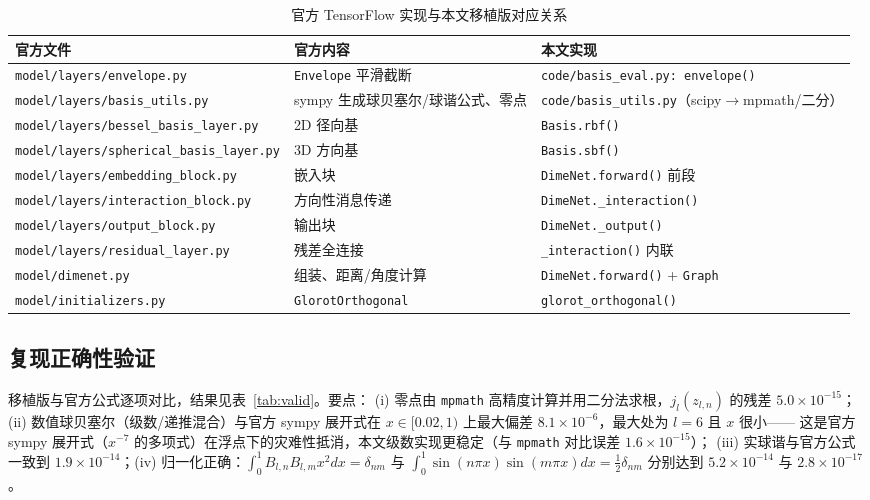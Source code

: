 \documentclass[UTF8,a4paper,11pt]{ctexart}
\begin{document}
\begin{table}[H]
\centering\footnotesize
\caption{官方 TensorFlow 实现与本文移植版对应关系}
\label{tab:map}
\begin{tabular}{@{}p{6.3cm}p{3.3cm}p{5.6cm}@{}}
\toprule
官方文件 & 官方内容 & 本文实现\\
\midrule
\texttt{model/layers/envelope.py} & \texttt{Envelope} 平滑截断 & \texttt{code/basis\_eval.py: envelope()}\\
\texttt{model/layers/basis\_utils.py} & sympy 生成球贝塞尔/球谐公式、零点 & \texttt{code/basis\_utils.py}（scipy$\to$mpmath/二分）\\
\texttt{model/layers/bessel\_basis\_layer.py} & 2D 径向基 & \texttt{Basis.rbf()}\\
\texttt{model/layers/spherical\_basis\_layer.py} & 3D 方向基 & \texttt{Basis.sbf()}\\
\texttt{model/layers/embedding\_block.py} & 嵌入块 & \texttt{DimeNet.forward()} 前段\\
\texttt{model/layers/interaction\_block.py} & 方向性消息传递 & \texttt{DimeNet.\_interaction()}\\
\texttt{model/layers/output\_block.py} & 输出块 & \texttt{DimeNet.\_output()}\\
\texttt{model/layers/residual\_layer.py} & 残差全连接 & \texttt{\_interaction()} 内联\\
\texttt{model/dimenet.py} & 组装、距离/角度计算 & \texttt{DimeNet.forward()} + \texttt{Graph}\\
\texttt{model/initializers.py} & \texttt{GlorotOrthogonal} & \texttt{glorot\_orthogonal()}\\
\bottomrule
\end{tabular}
\end{table}

\subsection{复现正确性验证}
移植版与官方公式逐项对比，结果见表~\ref{tab:valid}。要点：
(i) 零点由 \texttt{mpmath} 高精度计算并用二分法求根，$j_l(z_{l,n})$ 的残差 $5.0\times10^{-15}$；
(ii) 数值球贝塞尔（级数/递推混合）与官方 sympy 展开式在 $x\in[0.02,1)$ 上最大偏差 $8.1\times10^{-6}$，最大处为 $l=6$ 且 $x$ 很小——
这是官方 sympy 展开式（$x^{-7}$ 的多项式）在浮点下的灾难性抵消，本文级数实现更稳定（与 \texttt{mpmath} 对比误差 $1.6\times10^{-15}$）；
(iii) 实球谐与官方公式一致到 $1.9\times10^{-14}$；(iv) 归一化正确：$\int_0^1 B_{l,n}B_{l,m}x^2dx=\delta_{nm}$ 与 $\int_0^1\sin(n\pi x)\sin(m\pi x)dx=\tfrac12\delta_{nm}$
分别达到 $5.2\times10^{-14}$ 与 $2.8\times10^{-17}$。
\end{document}
